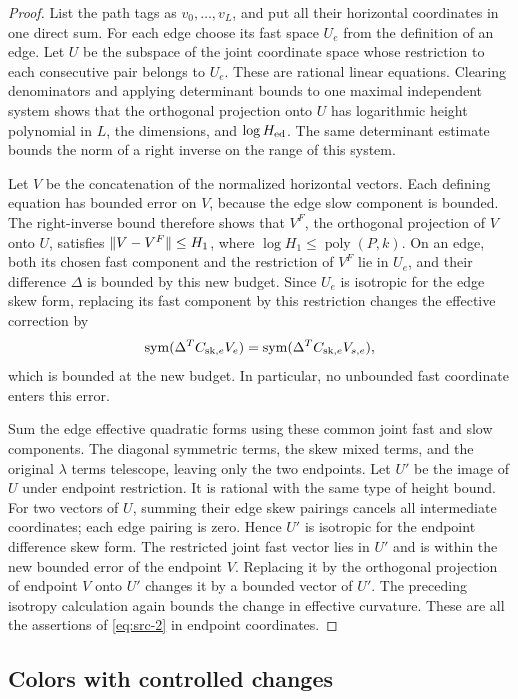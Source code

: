 \begin{proof}
List the path tags as $v_0,\ldots,v_L$, and put all their horizontal
coordinates in one direct sum.  For each edge choose its fast space
$U_e$ from the definition of an edge.  Let $U$ be the subspace of the
joint coordinate space whose restriction to each consecutive pair
belongs to $U_e$.  These are rational linear equations.  Clearing
denominators and applying determinant bounds to one maximal independent
system shows that the orthogonal projection onto $U$ has logarithmic
height polynomial in $L$, the dimensions, and $\log H_{\rm ed}$.
The same determinant estimate bounds the norm of a right inverse on the
range of this system.

Let $V$ be the concatenation of the normalized horizontal vectors.
Each defining equation has bounded error on $V$, because the edge slow
component is bounded.  The right-inverse bound therefore shows that
$V^F$, the orthogonal projection of $V$ onto $U$, satisfies
$\lVert V-V^F\rVert\le H_1$, where
$\log H_1\le\operatorname{poly}(P,k)$.  On an edge, both its chosen
fast component and the restriction of $V^F$ lie in $U_e$, and their
difference $\Delta$ is bounded by this new budget.  Since $U_e$ is
isotropic for the edge skew form, replacing its fast component by this
restriction changes the effective correction by
\[
 \operatorname{sym}(\Delta^T C_{{\rm sk},e}V_e)
 =\operatorname{sym}(\Delta^T C_{{\rm sk},e}V_{s,e}),
\]
which is bounded at the new budget.  In particular, no unbounded fast
coordinate enters this error.

Sum the edge effective quadratic forms using these common joint fast
and slow components.  The diagonal symmetric terms, the skew mixed
terms, and the original $\lambda$ terms telescope, leaving only the two
endpoints.  Let $U'$ be the image of $U$ under endpoint restriction.
It is rational with the same type of height bound.  For two vectors of
$U$, summing their edge skew pairings cancels all intermediate
coordinates; each edge pairing is zero.  Hence $U'$ is isotropic for
the endpoint difference skew form.  The restricted joint fast vector
lies in $U'$ and is within the new bounded error of the endpoint $V$.
Replacing it by the orthogonal projection of endpoint $V$ onto $U'$
changes it by a bounded vector of $U'$.  The preceding isotropy
calculation again bounds the change in effective curvature.  These are
all the assertions of \eqref{eq:src-2} in endpoint coordinates.
\end{proof}

\subsection{Colors with controlled changes}

